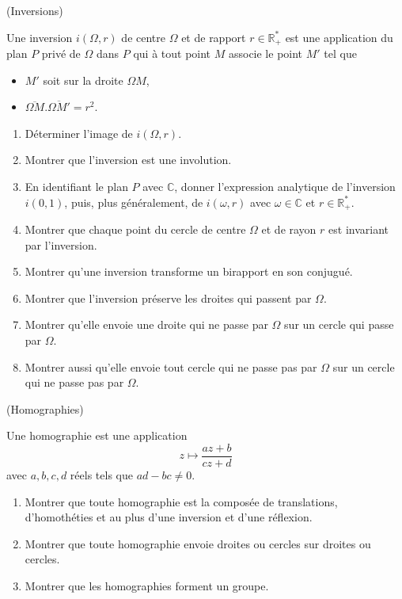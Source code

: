 \documentclass[a4paper,12pt,reqno]{amsart}
\begin{document}
\begin{exo} (Inversions)

  Une inversion $i(\Omega,r)$ de centre $\Omega$ et de rapport $r \in \mathbb{R}^{*}_{+}$ est une application du plan $P$ privé de $\Omega$ dans $P$ qui à tout point $M$ associe le point $M'$ tel que
  \begin{itemize}
    \item $M'$ soit sur la droite $\Omega M$,
    \item $\overline{\Omega M}.\overline{\Omega M'}=r^2$.
  \end{itemize}
  \begin{enumerate}
    \item Déterminer l'image de $i(\Omega,r)$.
    \item Montrer que l'inversion est une involution.
    \item En identifiant le plan $P$ avec $\mathbb{C}$, donner l'expression analytique de l'inversion $i(0,1)$, puis, plus généralement, de $i(\omega,r)$ avec $\omega \in \mathbb{C}$ et $r \in \mathbb{R}^{*}_{+}$.
    \item  Montrer que chaque point du cercle de centre $\Omega$ et de rayon $r$ est invariant par l'inversion.
    \item Montrer qu'une inversion transforme un birapport en son conjugué.
    \item Montrer que l'inversion préserve les droites qui passent par $\Omega$.
    \item Montrer qu'elle envoie une droite qui ne passe par $\Omega$ sur un cercle qui passe par $\Omega$.
    \item Montrer aussi qu'elle envoie tout cercle qui ne passe pas par $\Omega$ sur un cercle qui ne passe pas par $\Omega$.
  \end{enumerate}
\end{exo}


\begin{exo} (Homographies)

  Une homographie est une application
  $$
    z\mapsto \frac{az+b}{cz+d}
  $$
  avec $a,b,c,d$ réels tels que $ad-bc\neq 0$.
  \begin{enumerate}
    \item Montrer que toute homographie est la composée de translations, d'homothéties et au plus d'une inversion et d'une réflexion.
    \item Montrer que toute homographie envoie droites ou cercles sur droites ou cercles.
    \item Montrer que les homographies forment un groupe.
  \end{enumerate}
\end{exo}
\end{document}
